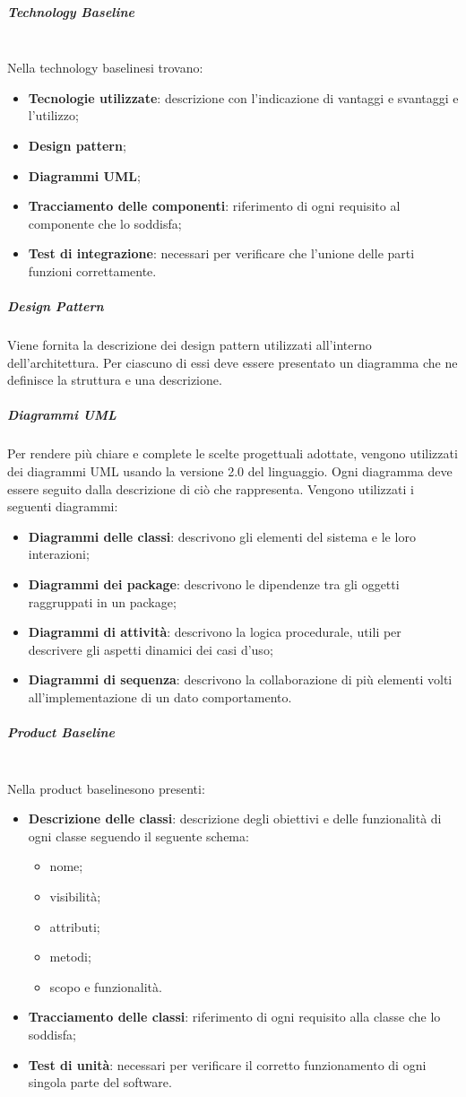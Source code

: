 \subparagraph*{Technology Baseline}\mbox{}\\ [1mm]
Nella technology baseline\glosp si trovano:
\begin{itemize}
	\item \textbf{Tecnologie utilizzate}: descrizione con l'indicazione di vantaggi e svantaggi e l'utilizzo;
	\item \textbf{Design pattern};
	\item \textbf{Diagrammi UML};
	\item \textbf{Tracciamento delle componenti}: riferimento di ogni requisito al componente che lo soddisfa;
	\item \textbf{Test di integrazione}: necessari per verificare che l'unione delle parti funzioni correttamente.
\end{itemize}
\subparagraph*{Design Pattern}
Viene fornita la descrizione dei design pattern utilizzati all'interno dell'architettura. Per ciascuno di essi deve essere presentato un diagramma che ne definisce la struttura e una descrizione.
\subparagraph*{Diagrammi UML}
Per rendere più chiare e complete le scelte progettuali adottate, vengono utilizzati dei diagrammi UML usando la versione 2.0 del linguaggio. Ogni diagramma deve essere seguito dalla descrizione di ciò che rappresenta.
Vengono utilizzati i seguenti diagrammi:
\begin{itemize}
	\item \textbf{Diagrammi delle classi}: descrivono gli elementi del sistema e le loro interazioni;
	\item \textbf{Diagrammi dei package}: descrivono le dipendenze tra gli oggetti raggruppati in un package;
	\item \textbf{Diagrammi di attività}: descrivono la logica procedurale, utili per descrivere gli aspetti dinamici dei casi d'uso;
	\item \textbf{Diagrammi di sequenza}: descrivono la collaborazione di più elementi volti all'implementazione di un dato comportamento.
\end{itemize}
\subparagraph*{Product Baseline}\mbox{}\\ [1mm]
Nella product baseline\glosp sono presenti:
\begin{itemize}
	\item \textbf{Descrizione delle classi}: descrizione degli obiettivi e delle funzionalità di ogni classe seguendo il seguente schema:
	\begin{itemize}
		\item nome;
		\item visibilità;
		\item attributi;
		\item metodi;
		\item scopo e funzionalità.
	\end{itemize}
	\item \textbf{Tracciamento delle classi}: riferimento di ogni requisito alla classe che lo soddisfa;
	\item \textbf{Test di unità}: necessari per verificare il corretto funzionamento di ogni singola parte del software.
\end{itemize}

